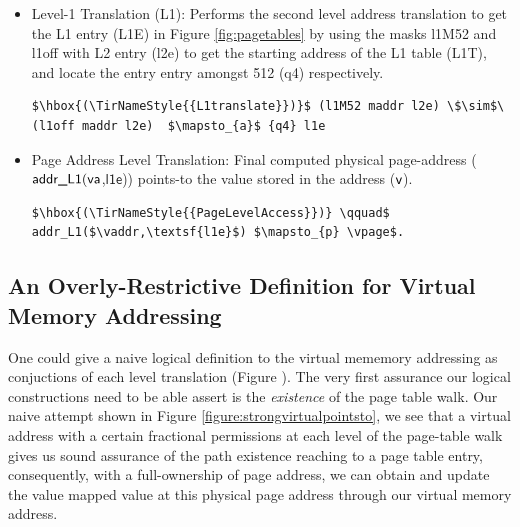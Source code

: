 \begin{itemize}
  \item Level-1 Translation (L1): Performs the second level address translation to get the L1 entry (L1E) in Figure \ref{fig:pagetables} by using the masks l1M52 and l1off with L2 entry (l2e) to get the starting address of the L1 table (L1T), and locate the entry entry amongst 512 (q4) respectively.
   \begin{lstlisting}[language=Coq]
    $\hbox{(\TirNameStyle{{L1translate}})}$ (l1M52 maddr l2e) \$\sim$\ (l1off maddr l2e)  $\mapsto_{a}$ {q4} l1e
    \end{lstlisting}
  \item Page Address Level Translation: Final computed physical page-address ($\textsf{addr\_L1}(\mathsf{va}$,$\textsf{l1e}$)) points-to the value stored in the address ($\textsf{v}$).
   \begin{lstlisting}[language=Coq]
    $\hbox{(\TirNameStyle{{PageLevelAccess}})} \qquad$ addr_L1($\vaddr,\textsf{l1e}$) $\mapsto_{p} \vpage$.
    \end{lstlisting} 
\end{itemize}

\subsection{An Overly-Restrictive Definition for Virtual Memory Addressing}
\label{sec:overly-restrictive}
One could give a naive logical definition to the virtual mememory addressing as conjuctions of each level translation 
(Figure ). The very first assurance our logical constructions need to be able assert is 
the \textit{existence} of the page table walk. Our naive attempt shown in Figure \ref{figure:strongvirtualpointsto}, 
we see that a virtual address with a certain fractional permissions at each level of the page-table walk gives us sound 
assurance of the path existence reaching to a page table entry, consequently, with a full-ownership of page address, 
we can obtain and update the value mapped value at this physical page address through our virtual memory address. 


